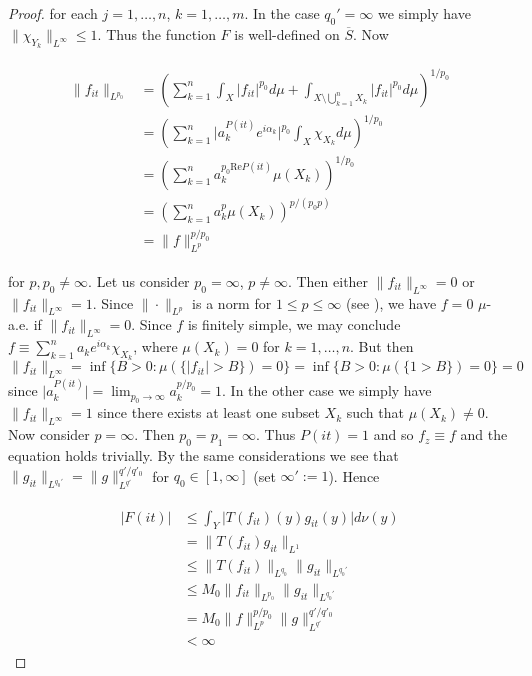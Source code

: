 \begin{proof}
				for each $j = 1,\hdots,n$, $k = 1,\hdots,m$. In the case $q_0' = \infty$ we simply have $\|\chi_{Y_k}\|_{L^\infty} \leqslant 1 $. Thus the function $F$ is well-defined on $\overline{S}$. Now

				\begin{gather}
					\begin{aligned}
						\|f_{it}\|_{L^{p_0}} &= \left(\sum_{k = 1}^n \int_X \vert f_{it} \vert^{p_0} d\mu + \int_{X \setminus \bigcup_{k = 1}^n X_k} \vert f_{it} \vert^{p_0} d\mu\right)^{1/p_0}\\
						&= \left(\sum_{k = 1}^n \vert a_k^{P(it)} e^{i\alpha_k}\vert^{p_0}\int_X \chi_{X_k} d\mu\right)^{1/p_0}\\
						&= \left(\sum_{k = 1}^n a_k^{p_0\mathrm{Re}P(it)}\mu(X_k)\right)^{1/p_0}\\
						&= \left(\sum_{k = 1}^n a_{k}^p\mu(X_k)\right)^{p/(p_0p)}\\
						&= \|f\|_{L^p}^{p/p_0} 
					\end{aligned}
				\end{gather}

				for $p,p_0 \neq \infty$. Let us consider $p_0 = \infty$, $p \neq \infty$. Then either $\|f_{it}\|_{L^{\infty}} = 0$ or $\|f_{it}\|_{L^{\infty}} = 1$. Since $\|\cdot\|_{L^p}$ is a norm for $1 \leqslant p \leqslant \infty$ (see \cite[231]{elstrodt:mass:2011}), we have $f = 0$ $\mu$-a.e. if $\|f_{it}\|_{L^{\infty}} = 0$. Since $f$ is finitely simple, we may conclude $f \equiv \sum_{k = 1}^n a_k e^{i\alpha_k}\chi_{X_k}$, where $\mu(X_k) = 0$ for $k = 1,\hdots,n$. But then $\|f_{it}\|_{L^{\infty}} = \inf\{B > 0 : \mu(\{\vert f_{it} \vert > B\}) = 0\} =  \inf\{B > 0 : \mu(\{1 > B\}) = 0\}= 0$ since $\vert a_k^{P(it)}\vert = \lim_{p_0 \rightarrow \infty} a_k^{p/p_0} = 1$. In the other case we simply have $\|f_{it}\|_{L^{\infty}} = 1$ since there exists at least one subset $X_k$ such that $\mu(X_k) \neq 0$. Now consider $p = \infty$. Then $p_0 = p_1 = \infty$. Thus $P(it) = 1$ and so $f_z \equiv f$ and the equation holds trivially. By the same considerations we see that $\|g_{it}\|_{L^{q_0'}} = \|g\|_{L^{q'}}^{q'/q'_0}$ for $q_0 \in [1,\infty]$ (set $\infty' := 1 $). Hence

				\begin{gather}
					\begin{aligned}
						\vert F(it) \vert &\leqslant \int_Y \vert T(f_{it})(y)g_{it}(y)\vert d\nu(y)\\
						&= \|T(f_{it}) g_{it}\|_{L^1}\\
						&\leqslant \|T(f_{it})\|_{L^{q_0}}\|g_{it}\|_{L^{q_0'}}\\
						&\leqslant M_0 \|f_{it}\|_{L^{p_0}} \|g_{it}\|_{L^{q_0'}}\\
						&= M_0 \|f\|_{L^p}^{p/p_0} \|g\|_{L^{q'}}^{q'/q'_0}\\
						&< \infty
					\end{aligned}
				\end{gather}


\end{proof}
